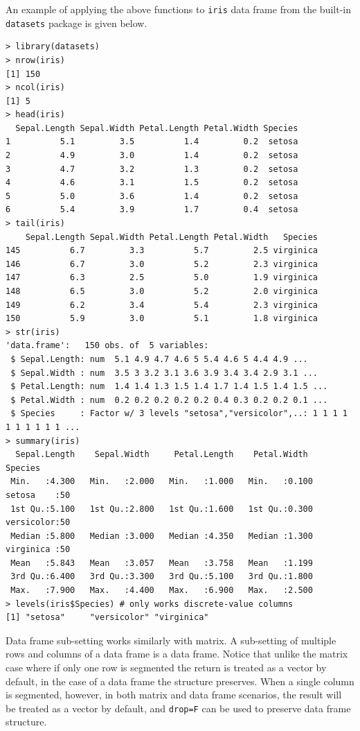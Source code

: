 An example of applying the above functions to \verb|iris| data frame from the built-in \verb|datasets| package is given below.
\begin{lstlisting}
> library(datasets)
> nrow(iris)
[1] 150
> ncol(iris)
[1] 5
> head(iris)
  Sepal.Length Sepal.Width Petal.Length Petal.Width Species
1          5.1         3.5          1.4         0.2  setosa
2          4.9         3.0          1.4         0.2  setosa
3          4.7         3.2          1.3         0.2  setosa
4          4.6         3.1          1.5         0.2  setosa
5          5.0         3.6          1.4         0.2  setosa
6          5.4         3.9          1.7         0.4  setosa
> tail(iris)
    Sepal.Length Sepal.Width Petal.Length Petal.Width   Species
145          6.7         3.3          5.7         2.5 virginica
146          6.7         3.0          5.2         2.3 virginica
147          6.3         2.5          5.0         1.9 virginica
148          6.5         3.0          5.2         2.0 virginica
149          6.2         3.4          5.4         2.3 virginica
150          5.9         3.0          5.1         1.8 virginica
> str(iris)
'data.frame':	150 obs. of  5 variables:
 $ Sepal.Length: num  5.1 4.9 4.7 4.6 5 5.4 4.6 5 4.4 4.9 ...
 $ Sepal.Width : num  3.5 3 3.2 3.1 3.6 3.9 3.4 3.4 2.9 3.1 ...
 $ Petal.Length: num  1.4 1.4 1.3 1.5 1.4 1.7 1.4 1.5 1.4 1.5 ...
 $ Petal.Width : num  0.2 0.2 0.2 0.2 0.2 0.4 0.3 0.2 0.2 0.1 ...
 $ Species     : Factor w/ 3 levels "setosa","versicolor",..: 1 1 1 1 1 1 1 1 1 1 ...
> summary(iris)
  Sepal.Length    Sepal.Width     Petal.Length    Petal.Width          Species
 Min.   :4.300   Min.   :2.000   Min.   :1.000   Min.   :0.100   setosa    :50
 1st Qu.:5.100   1st Qu.:2.800   1st Qu.:1.600   1st Qu.:0.300   versicolor:50
 Median :5.800   Median :3.000   Median :4.350   Median :1.300   virginica :50
 Mean   :5.843   Mean   :3.057   Mean   :3.758   Mean   :1.199
 3rd Qu.:6.400   3rd Qu.:3.300   3rd Qu.:5.100   3rd Qu.:1.800
 Max.   :7.900   Max.   :4.400   Max.   :6.900   Max.   :2.500
> levels(iris$Species) # only works discrete-value columns
[1] "setosa"     "versicolor" "virginica"
\end{lstlisting}

Data frame sub-setting works similarly with matrix. A sub-setting of multiple rows and columns of a data frame is a data frame. Notice that unlike the matrix case where if only one row is segmented the return is treated as a vector by default, in the case of a data frame the structure preserves. When a single column is segmented, however, in both matrix and data frame scenarios, the result will be treated as a vector by default, and \verb|drop=F| can be used to preserve data frame structure.

